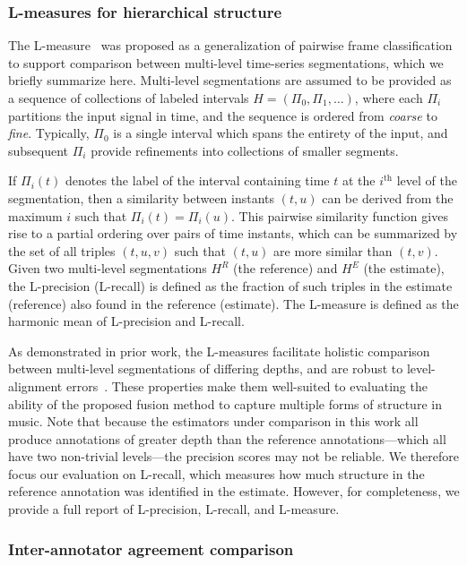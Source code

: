\documentclass{article}
\begin{document}
\subsubsection{L-measures for hierarchical structure}\label{sec:lmeasures}

The L-measure~\cite{mcfee2017evaluating} was proposed as a generalization of pairwise frame classification~\cite{levy2008structural} to support comparison between multi-level time-series segmentations, which we briefly summarize here.
Multi-level segmentations are assumed to be provided as a sequence of collections of labeled intervals $H = (\Pi_0, \Pi_1, \dots)$, where each $\Pi_i$ partitions the input signal in time, and the sequence is ordered from \emph{coarse} to \emph{fine}.
Typically, $\Pi_0$ is a single interval which spans the entirety of the input, and subsequent $\Pi_i$ provide refinements into collections of smaller segments.

If $\Pi_i(t)$ denotes the label of the interval containing time $t$ at the $i^\text{th}$ level of the segmentation, then a similarity between instants $(t, u)$ can be derived from the maximum $i$ such that $\Pi_i(t) = \Pi_i(u)$.
This pairwise similarity function gives rise to a partial ordering over pairs of time instants, which can be summarized by the set of all triples $(t, u, v)$ such that $(t,u)$ are more similar than $(t, v)$.
Given two multi-level segmentations $H^R$ (the reference) and $H^E$ (the estimate), the L-precision (L-recall) is defined as the fraction of such triples in the estimate (reference) also found in the reference (estimate).
The L-measure is defined as the harmonic mean of L-precision and L-recall.

As demonstrated in prior work, the L-measures facilitate holistic comparison between multi-level segmentations of differing depths, and are robust to level-alignment errors~\cite{mcfee2017evaluating}.
These properties make them well-suited to evaluating the ability of the proposed fusion method to capture multiple forms of structure in music.
Note that because the estimators under comparison in this work all produce annotations of greater depth than the reference annotations---which all have two non-trivial levels---the precision scores may not be reliable.
We therefore focus our evaluation on L-recall, which measures how much structure in the reference annotation was identified in the estimate.
However, for completeness, we provide a full report of L-precision, L-recall, and L-measure.


\subsubsection{Inter-annotator agreement comparison}
\end{document}

